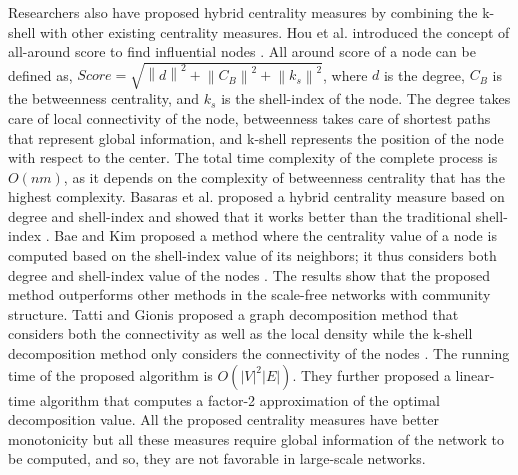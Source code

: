 \documentclass[12pt,3p]{article}
\begin{document}
Researchers also have proposed hybrid centrality measures by combining the k-shell with other existing centrality measures. Hou et al. introduced the concept of all-around score to find influential nodes \cite{hou2012identifying}. All around score of a node can be defined as, $Score=\sqrt{\left \| d \right \|^2 + \left \| C_B \right \| ^2 +\left \| k_s \right \|^2 }$, where $d$ is the degree, $C_B$ is the betweenness centrality, and $k_s$ is the shell-index of the node. The degree takes care of local connectivity of the node, betweenness takes care of shortest paths that represent global information, and k-shell represents the position of the node with respect to the center. The total time complexity of the complete process is $O(nm)$, as it depends on the complexity of betweenness centrality that has the highest complexity. Basaras et al. proposed a hybrid centrality measure based on degree and shell-index and showed that it works better than the traditional shell-index \cite{basaras2013detecting}. Bae and Kim proposed a method where the centrality value of a node is computed based on the shell-index value of its neighbors; it thus considers both degree and shell-index value of the nodes \cite{bae2014identifying}. The results show that the proposed method outperforms other methods in the scale-free networks with community structure. Tatti and Gionis proposed a graph decomposition method that considers both the connectivity as well as the local density while the k-shell decomposition method only considers the connectivity of the nodes \cite{tatti2015density}. The running time of the proposed algorithm is $O(|V|^2|E|)$. They further proposed a linear-time algorithm that computes a factor-2 approximation of the optimal decomposition value. All the proposed centrality measures have better monotonicity but all these measures require global information of the network to be computed, and so, they are not favorable in large-scale networks.
\end{document}
